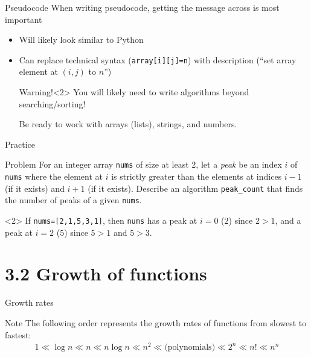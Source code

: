 \documentclass[dvipsnames,t]{beamer}
\begin{document}
\begin{frame}{Pseudocode}
When writing pseudocode, getting the message across is most important
\begin{itemize}
\item Will likely look similar to Python
\item Can replace technical syntax (\texttt{array[i][j]=n}) with description (``set array element at $(i,j)$ to $n$'')

\begin{alertblock}{Warning!}<2>
You will likely need to write algorithms beyond searching/sorting!

Be ready to work with arrays (lists), strings, and numbers.
\end{alertblock}
\end{itemize}

\end{frame}

\begin{frame}{Practice}
\begin{block}{Problem}
	For an integer array \texttt{nums} of size at least $2$, let a \textit{peak} be an index $i$ of \texttt{nums} where the element at $i$ is strictly greater than the elements at indices $i-1$ (if it exists) and $i+1$ (if it exists). Describe an algorithm \texttt{peak\_count} that finds the number of peaks of a given \texttt{nums}.
\end{block}
\begin{example}<2>
If \texttt{nums=[2,1,5,3,1]}, then \texttt{nums} has a peak at $i=0$ ($2$) since $2>1$, and a peak at $i=2$ ($5$) since $5>1$ and $5>3$.
\end{example}
\end{frame}

\section{3.2 Growth of functions}

\begin{frame}{Growth rates}
\begin{block}{Note}
The following order represents the growth rates of functions from slowest to fastest:
\begin{align*}
1 \ll \log{n} \ll n \ll n\log{n} \ll n^2 \ll \text{(polynomials)} \ll 2^n \ll n! \ll n^n
\end{align*}
\end{block}
\end{frame}
\end{document}
